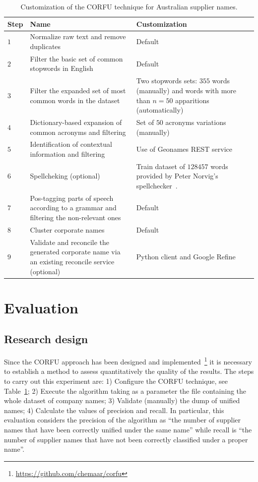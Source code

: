 \documentclass{llncs}
\begin{document}
\begin{table}[!htb]
\renewcommand{\arraystretch}{1.3}
\begin{center}
\begin{tabular}{|p{1cm}|p{5.5cm}|p{5.5cm}|}
\hline
  \textbf{Step} & \textbf{Name} & \textbf{Customization}  \\  \hline
  $1$ & Normalize raw text and remove duplicates & Default \\ \hline
  $2$ & Filter the basic set of common stopwords in English & Default\\ \hline
  $3$ & Filter the expanded set of most common words in the dataset & Two stopwords sets: $355$ words (manually) and words with more than $n=50 $ apparitions (automatically) \\ \hline
  $4$ & Dictionary-based expansion of common acronyms and filtering & Set of $50$ acronyms variations (manually) \\ \hline
  $5$ & Identification of contextual information and filtering & Use of Geonames REST service\\ \hline
  $6$ & Spellcheking (optional) & Train dataset of $128457$ words provided by Peter Norvig's spellchecker~\cite{NorvigSpelling}. \\ \hline
  $7$ & Pos-tagging parts of speech according to a grammar and filtering the non-relevant ones & Default \\ \hline
  $8$ & Cluster corporate names & Default \\ \hline
  $9$ & Validate and reconcile the generated corporate name via an existing reconcile service (optional) & Python client and Google Refine \\ \hline
  \hline
  \end{tabular}
  \caption{Customization of the CORFU technique for Australian supplier names.}
  \label{config-corfu}
  \end{center}
\end{table} 

\section{Evaluation}
\subsection{Research design}
Since the CORFU approach has been designed and implemented~\footnote{\url{https://github.com/chemaar/corfu}} it is necessary to 
establish a method to assess quantitatively the quality of the results.  The steps to carry 
out this experiment are: 1) Configure the CORFU technique, see Table~\ref{config-corfu};  
2) Execute the algorithm taking as a parameter the file containing the whole dataset of company names;
3) Validate (manually) the dump of unified names; 4) Calculate the values of 
precision and recall. In particular, this evaluation considers the precision of the algorithm as ``the number of supplier 
names that have been correctly unified under the same name'' while recall is 
``the number of supplier names that have not been correctly classified under a proper name''. 
\end{document}

